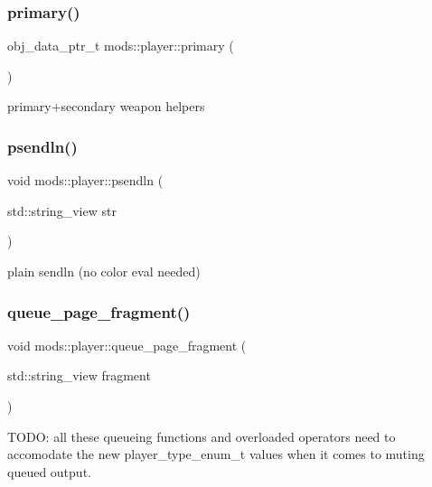\subsubsection{\texorpdfstring{primary()}{primary()}}
{\footnotesize\ttfamily obj\+\_\+data\+\_\+ptr\+\_\+t mods\+::player\+::primary (\begin{DoxyParamCaption}{ }\end{DoxyParamCaption})}

primary+secondary weapon helpers \mbox{\label{classmods_1_1player_aaf97c2eac068d263981699d65d13d64d}} 
\subsubsection{\texorpdfstring{psendln()}{psendln()}}
{\footnotesize\ttfamily void mods\+::player\+::psendln (\begin{DoxyParamCaption}\item[{std\+::string\+\_\+view}]{str }\end{DoxyParamCaption})}

\textquotesingle{}plain\textquotesingle{} sendln (no color eval needed) \mbox{\label{classmods_1_1player_a43832fcf34ddb3e7968a26703d3250cd}} 
\subsubsection{\texorpdfstring{queue\+\_\+page\+\_\+fragment()}{queue\_page\_fragment()}}
{\footnotesize\ttfamily void mods\+::player\+::queue\+\_\+page\+\_\+fragment (\begin{DoxyParamCaption}\item[{std\+::string\+\_\+view}]{fragment }\end{DoxyParamCaption})\hspace{0.3cm}{\ttfamily [inline]}}

T\+O\+DO\+: all these queueing functions and overloaded operators need to accomodate the new player\+\_\+type\+\_\+enum\+\_\+t values when it comes to muting queued output. \mbox{\label{classmods_1_1player_aec46cbc02ebe8769c4c831510acafce3}} 
